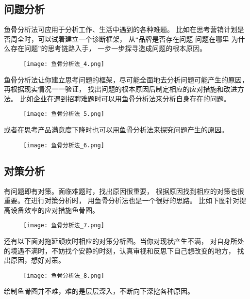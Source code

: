 \documentclass[../main.tex]{subfiles}
\begin{document}
\subsection{问题分析}
鱼骨分析法可应用于分析工作、生活中遇到的各种难题。
比如在思考营销计划是否周全时，可以试着建立一个诊断框架，
从``品牌是否存在问题-问题在哪里-为什么存在问题''的思考链路入手，
一步一步探寻造成问题的根本原因。
%
\begin{figure}[H]
  \begin{center}
    \texttt{[image: 鱼骨分析法\_4.png]}
  \end{center}
\end{figure}
%
鱼骨分析法让你建立思考问题的框架，尽可能全面地去分析问题可能产生的原因，
再根据现实情况一一验证，
找出问题的根本原因后制定相应的应对措施和改进方法。
比如企业在遇到招聘难题时可以用鱼骨分析法来分析自身存在的问题。
%
\begin{figure}[H]
  \begin{center}
    \texttt{[image: 鱼骨分析法\_5.png]}
  \end{center}
\end{figure}
%
或者在思考产品满意度下降时也可以用鱼骨分析法来探究问题产生的原因。
%
\begin{figure}[H]
  \begin{center}
    \texttt{[image: 鱼骨分析法\_6.png]}
  \end{center}
\end{figure}
%
\subsection{对策分析}
有问题即有对策。面临难题时，找出原因很重要，
根据原因找到相应的对策也很重要。在进行对策分析时，
用鱼骨分析法也是一个很好的思路。
比如下图针对提高设备效率的应对措施鱼骨图。
%
\begin{figure}[H]
  \begin{center}
    \texttt{[image: 鱼骨分析法\_7.png]}
  \end{center}
\end{figure}
%
还有以下面对拖延顽疾时相应的对策分析图。当你对现状产生不满，
对自身所处的境遇不满时，不妨找个安静的时刻，认真审视和反思下自己想改变的地方，
找出原因，想好对策。
%
\begin{figure}[H]
  \begin{center}
    \texttt{[image: 鱼骨分析法\_8.png]}
  \end{center}
\end{figure}
%
绘制鱼骨图并不难，难的是层层深入，不断向下深挖各种原因。
%
\end{document}
